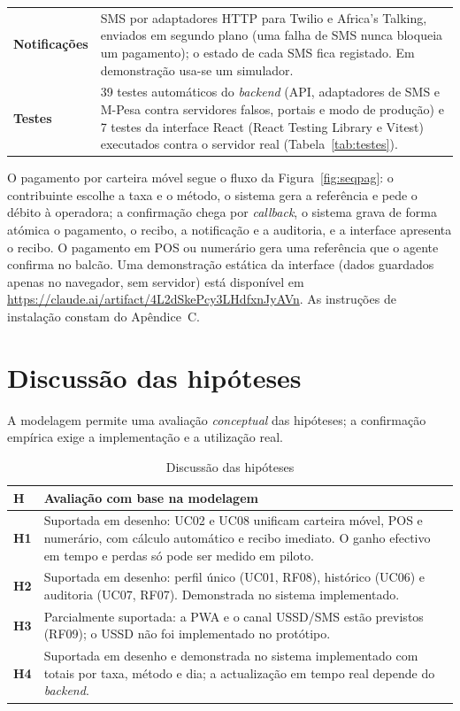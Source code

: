 \documentclass[12pt,a4paper,openany]{report}
\begin{document}
\begin{table}[!htbp]
\begin{tabularx}{\textwidth}{@{}>{\bfseries}p{3cm}X@{}}
Notificações & SMS por adaptadores HTTP para Twilio e Africa's Talking, enviados em segundo plano (uma falha de SMS nunca bloqueia um pagamento); o estado de cada SMS fica registado. Em demonstração usa-se um simulador. \\
Testes & 39 testes automáticos do \emph{backend} (API, adaptadores de SMS e M-Pesa contra servidores falsos, portais e modo de produção) e 7 testes da interface React (React Testing Library e Vitest) executados contra o servidor real (Tabela~\ref{tab:testes}). \\
\bottomrule
\end{tabularx}
\endgroup
\end{table}

O pagamento por carteira móvel segue o fluxo da Figura~\ref{fig:seqpag}: o contribuinte escolhe a taxa e o método, o sistema gera a referência e pede o débito à operadora; a confirmação chega por \emph{callback}, o sistema grava de forma atómica o pagamento, o recibo, a notificação e a auditoria, e a interface apresenta o recibo. O pagamento em POS ou numerário gera uma referência que o agente confirma no balcão. Uma demonstração estática da interface (dados guardados apenas no navegador, sem servidor) está disponível em \url{https://claude.ai/artifact/4L2dSkePcy3LHdfxnJyAVn}. As instruções de instalação constam do Apêndice~C.

\section{Discussão das hipóteses}
A modelagem permite uma avaliação \emph{conceptual} das hipóteses; a confirmação empírica exige a implementação e a utilização real.

\begin{table}[!htbp]
\caption{Discussão das hipóteses}\label{tab:hip}
\begingroup\singlespacing\small
\begin{tabularx}{\textwidth}{@{}>{\bfseries}p{1cm}X@{}}
\toprule
H & Avaliação com base na modelagem \\
\midrule
H1 & Suportada em desenho: UC02 e UC08 unificam carteira móvel, POS e numerário, com cálculo automático e recibo imediato. O ganho efectivo em tempo e perdas só pode ser medido em piloto. \\
H2 & Suportada em desenho: perfil único (UC01, RF08), histórico (UC06) e auditoria (UC07, RF07). Demonstrada no sistema implementado. \\
H3 & Parcialmente suportada: a PWA e o canal USSD/SMS estão previstos (RF09); o USSD não foi implementado no protótipo. \\
H4 & Suportada em desenho e demonstrada no sistema implementado com totais por taxa, método e dia; a actualização em tempo real depende do \emph{backend}. \\
\bottomrule
\end{tabularx}
\endgroup
\end{table}
\end{document}
